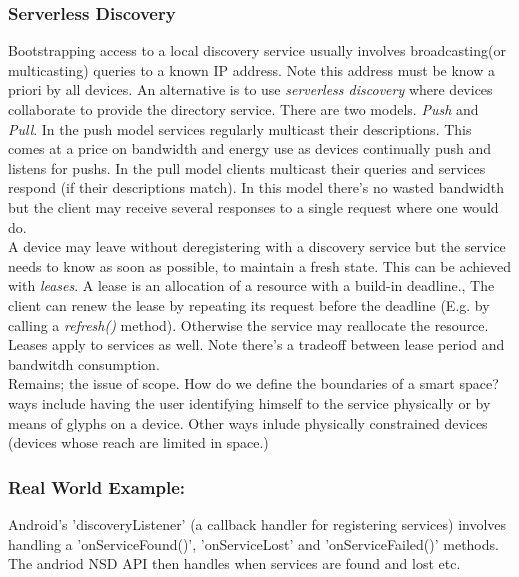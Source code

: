\subsubsection{Serverless Discovery}
Bootstrapping access to a local discovery service usually involves broadcasting(or multicasting) queries to a known IP address. Note this address must be know a priori by all devices. An alternative is to use \textit{serverless discovery} where devices collaborate to provide the directory service. There are two models. \textit{Push} and \textit{Pull}. In the push model services regularly multicast their descriptions. This comes at a price on bandwidth and energy use as devices continually push and listens for pushs. In the pull model clients multicast their queries and services respond (if their descriptions  match). In this model there's no wasted bandwidth but the client may receive several responses to a single request where one would do.\\

A device may leave without deregistering with a discovery service but the service needs to know as soon as possible, to maintain a fresh state. This can be achieved with \textit{leases}. A lease is an allocation of a resource with a build-in deadline., The client can renew the lease by repeating its request before the deadline (E.g. by calling a \textit{refresh()} method). Otherwise the service may reallocate the resource. Leases apply to services as well. Note there's a tradeoff between lease period and bandwitdh consumption.          \\

Remains; the issue of scope. How do we define the boundaries of a smart space? ways include having the user identifying himself to the service physically or by means of glyphs on a device. Other ways inlude physically constrained devices (devices whose reach are limited in space.) \\ 


\subsubsection{Real World Example:}
Android's 'discoveryListener' (a callback handler for registering services) involves handling a 'onServiceFound()', 'onServiceLost' and  'onServiceFailed()' methods.\\

The andriod NSD API then handles when services are found and lost etc.\\

